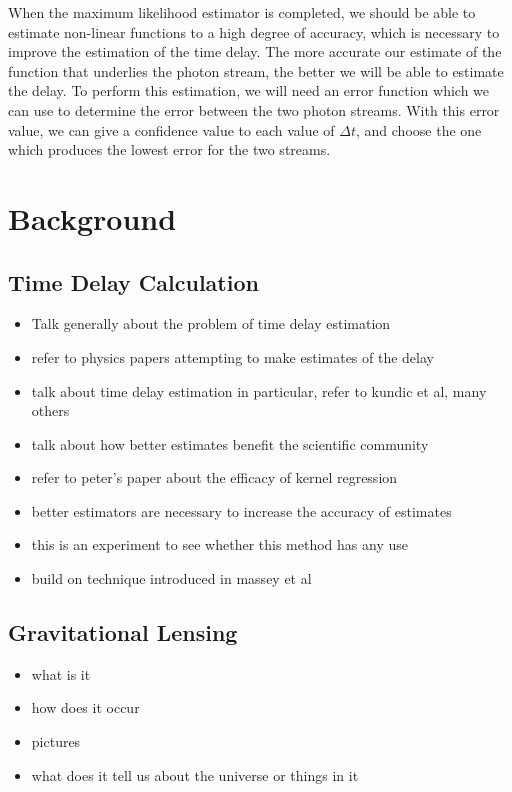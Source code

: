 \documentclass[a4paper,11pt]{article}
\begin{document}
    When the maximum likelihood estimator is completed, we should be
    able to estimate non-linear functions to a high degree of
    accuracy, which is necessary to improve the estimation of the time
    delay. The more accurate our estimate of the function that
    underlies the photon stream, the better we will be able to
    estimate the delay. To perform this estimation, we will need an
    error function which we can use to determine the error between the
    two photon streams. With this error value, we can give a
    confidence value to each value of $\Delta t$, and choose the one
    which produces the lowest error for the two streams.
\section{Background}
\label{sec-2}
\subsection{Time Delay Calculation}
\label{sec-2-1}

\begin{itemize}
\item Talk generally about the problem of time delay estimation
\item refer to physics papers attempting to make estimates of the delay
\item talk about time delay estimation in particular, refer to kundic et al, many others
\item talk about how better estimates benefit the scientific community
\item refer to peter's paper about the efficacy of kernel regression
\item better estimators are necessary to increase the accuracy of estimates
\item this is an experiment to see whether this method has any use
\item build on technique introduced in massey et al
\end{itemize}
\subsection{Gravitational Lensing}
\label{sec-2-2}

\begin{itemize}
\item what is it
\item how does it occur
\item pictures
\item what does it tell us about the universe or things in it
\end{itemize}
\end{document}
